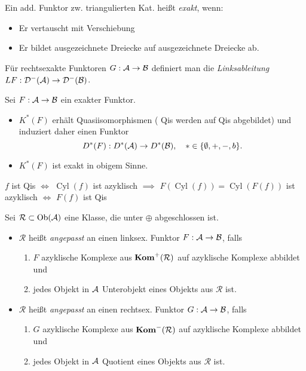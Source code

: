 \documentclass{cheat-sheet}
\DeclareMathOperator{\Cyl}{Cyl} %
\newcommand{\Ada}{\mathcal{R}} %
\begin{document}
\begin{defn}
  Ein add. Funktor zw. triangulierten Kat. heißt \emph{exakt}, wenn:
  \begin{itemize}
    \item Er vertauscht mit Verschiebung
    \item Er bildet ausgezeichnete Dreiecke auf ausgezeichnete Dreiecke ab.
  \end{itemize}
\end{defn}

\begin{bem}
  Für rechtsexakte Funktoren $G : \mathcal{A} \to \mathcal{B}$ definiert man die \emph{Linksableitung} $LF : \mathcal{D}^-(\mathcal{A}) \to \mathcal{D}^-(\mathcal{B})$.
\end{bem}

\begin{prop}
  Sei $F : \mathcal{A} \to \mathcal{B}$ ein exakter Funktor.
  \begin{itemize}
    \item $K^*(F)$ erhält Quasiisomorphismen (\dh{} Qis werden auf Qis abgebildet) und induziert daher einen Funktor
    \[ D^*(F) : D^*(\mathcal{A}) \to D^*(\mathcal{B}), \quad * \in \{ \emptyset, {+}, {-}, b \}. \]
    \item $K^*(F)$ ist exakt in obigem Sinne.
  \end{itemize}
\end{prop}

\begin{beweisidee}
  $f$ ist Qis $\iff$ $\Cyl(f)$ ist azyklisch $\implies$ $F(\Cyl(f)) = \Cyl(F(f))$ ist azyklisch $\iff$ $F(f)$ ist Qis
\end{beweisidee}

\begin{defn}
  Sei $\Ada \subset \Ob(\Aat)$ eine Klasse, die unter $\oplus$ abgeschlossen ist.
  \begin{itemize}
    \item $\Ada$ heißt \emph{angepasst} an einen linksex. Funktor $F : \mathcal{A} \to \mathcal{B}$, falls \\
    \vspace{-4pt}
    \begin{enumerate}[label=\alph*),leftmargin=1.6em]
      \item $F$ azyklische Komplexe aus $\Kom^+(\Ada)$ auf azyklische Komplexe abbildet und \\
      \item jedes Objekt in $\mathcal{A}$ Unterobjekt eines Objekts aus $\Ada$ ist.
    \end{enumerate}
    \item $\Ada$ heißt \emph{angepasst} an einen rechtsex. Funktor $G : \mathcal{A} \to \mathcal{B}$, falls
    \vspace{-4pt}
    \begin{enumerate}[label=\alph*),leftmargin=1.6em]
      \item $G$ azyklische Komplexe aus $\Kom^-(\Ada)$ auf azyklische Komplexe abbildet und
      \item jedes Objekt in $\mathcal{A}$ Quotient eines Objekts aus $\Ada$ ist.
    \end{enumerate}
  \end{itemize}
\end{defn}
\end{document}

